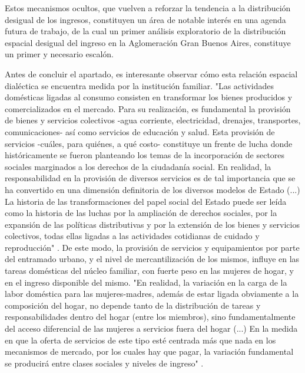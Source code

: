 	Estos mecanismos ocultos, que vuelven a reforzar la tendencia a la distribución desigual de los ingresos, constituyen un área de notable interés en una agenda futura de trabajo, de la cual un primer análisis exploratorio de la distribución espacial desigual del ingreso en la Aglomeración Gran Buenos Aires, constituye un primer y necesario escalón. 
	
	Antes de concluir el apartado, es interesante observar cómo esta relación espacial dialéctica se encuentra medida por la institución familiar. "Las actividades domésticas ligadas al consumo consisten en transformar los bienes producidos y comercializados en el mercado. Para su realización, es fundamental la provisión de bienes y servicios colectivos -agua corriente, electricidad, drenajes, transportes, comunicaciones- así como servicios de educación y salud. Esta provisión de servicios -cuáles, para quiénes, a qué costo- constituye un frente de lucha donde históricamente se fueron planteando los temas de la incorporación de sectores sociales marginados a los derechos de la ciudadanía social. En realidad, la responsabilidad en la provisión de diversos servicios es de tal importancia que se ha convertido en una dimensión definitoria de los diversos modelos de Estado (...) La historia de las transformaciones del papel social del Estado puede ser leída como la historia de las luchas por la ampliación de derechos sociales, por la expansión de las políticas distributivas y por la extensión de los bienes y servicios colectivos, todas ellas ligadas a las actividades cotidianas de cuidado y reproducción" \cite[p.~91]{jelin}. De este modo, la provisión de servicios y equipamientos por parte del entramado urbano, y el nivel de mercantilización de los mismos, influye en las tareas domésticas del núcleo familiar, con fuerte peso en las mujeres de hogar, y en el ingreso disponible del mismo. "En realidad, la variación en la carga de la labor doméstica para las mujeres-madres, además de estar ligada obviamente a la composición del hogar, no depende tanto de la distribución de tareas y responsabilidades dentro del hogar (entre los miembros), sino fundamentalmente del acceso diferencial de las mujeres a servicios fuera del hogar (...) En la medida en que la oferta de servicios de este tipo esté centrada más que nada en los mecanismos de mercado, por los cuales hay que pagar, la variación fundamental se producirá entre clases sociales y niveles de ingreso" \cite[p.~97]{jelin}.
